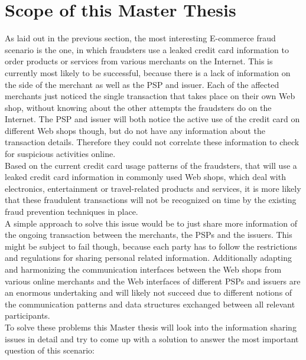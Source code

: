 
\section{Scope of this Master Thesis}
\label{sec:scope_thesis}

As laid out in the previous section, the most interesting \gls{E-commerce} fraud scenario is the one, in which fraudsters use a leaked credit card information to order products or services from various merchants on the Internet. This is currently most likely to be successful, because there is a lack of information on the side of the merchant as well as the \gls{PSP} and issuer. Each of the affected merchants just noticed the single transaction that takes place on their own Web shop, without knowing about the other attempts the fraudsters do on the Internet. The \gls{PSP} and issuer will both notice the active use of the credit card on different Web shops though, but do not have any information about the transaction details. Therefore they could not correlate these information to check for suspicious activities online. \\

Based on the current credit card usage patterns of the fraudsters, that will use a leaked credit card information in commonly used Web shops, which deal with electronics, entertainment or travel-related products and services, it is more likely that these fraudulent transactions will not be recognized on time by the existing fraud prevention techniques in place. \\

A simple approach to solve this issue would be to just share more information of the ongoing transaction between the merchants, the \gls{PSP}s and the issuers. This might be subject to fail though, because each party has to follow the restrictions and regulations for sharing personal related information. Additionally adapting and harmonizing the communication interfaces between the Web shops from various online merchants and the Web interfaces of different \gls{PSP}s and issuers are an enormous undertaking and will likely not succeed due to different notions of the communication patterns and data structures exchanged between all relevant participants. \\

To solve these problems this Master thesis will look into the information sharing issues in detail and try to come up with a solution to answer the most important question of this scenario: \@

